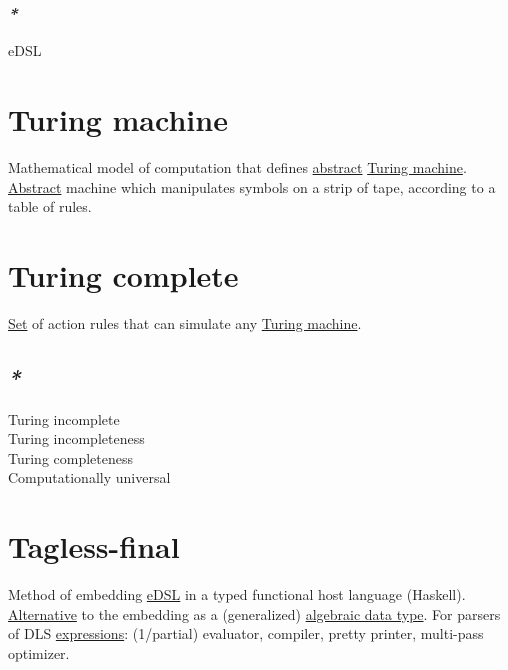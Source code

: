 \documentclass[a4paper,14pt,oneside]{book}
\begin{document}
\subsection{\emph{*}}
\label{sec:org8747926}

\label{orgd8b460a}eDSL\\

\chapter{\label{org94f2766}Turing machine}
\label{sec:org10eae72}
Mathematical model of computation that defines \hyperref[org321fc4b]{abstract} \hyperref[org94f2766]{Turing machine}. \hyperref[org321fc4b]{Abstract} machine which manipulates symbols on a strip of tape, according to a table of rules.\\

\chapter{\label{org410fb57}Turing complete}
\label{sec:orga8bb2b8}

\hyperref[orge119629]{Set} of action rules that can simulate any \hyperref[org94f2766]{Turing machine}.\\

\section{\emph{*}}
\label{sec:org7025141}

\label{orgbe42227}Turing incomplete\\
\label{orgff985ad}Turing incompleteness\\
\label{org761e970}Turing completeness\\
\label{org54b84b8}Computationally universal\\

\chapter{\label{orgea2e7cc}Tagless-final}
\label{sec:org72071f9}
Method of embedding \hyperref[orgd8b460a]{eDSL} in a typed functional host language (Haskell). \hyperref[orgb0e4eb4]{Alternative} to the embedding as a (generalized) \hyperref[org05a048b]{algebraic data type}. For parsers of DLS \hyperref[org8896d2c]{expressions}: (1/partial) evaluator, compiler, pretty printer, multi-pass optimizer.\\
\end{document}
